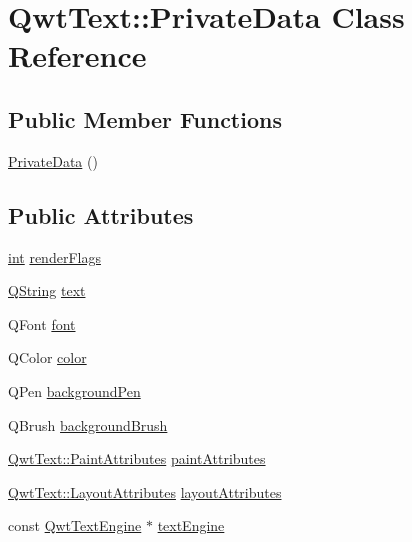\hypertarget{class_qwt_text_1_1_private_data}{\section{Qwt\-Text\-:\-:Private\-Data Class Reference}
\label{class_qwt_text_1_1_private_data}
}
\subsection*{Public Member Functions}
\begin{DoxyCompactItemize}
\item 
\hyperlink{class_qwt_text_1_1_private_data_a1ce7f844c2dda82aaa3c68c4bf7cf666}{Private\-Data} ()
\end{DoxyCompactItemize}
\subsection*{Public Attributes}
\begin{DoxyCompactItemize}
\item 
\hyperlink{ioapi_8h_a787fa3cf048117ba7123753c1e74fcd6}{int} \hyperlink{class_qwt_text_1_1_private_data_a85eca1b1929c48574ebfcbcfb20a5a26}{render\-Flags}
\item 
\hyperlink{group___u_a_v_objects_plugin_gab9d252f49c333c94a72f97ce3105a32d}{Q\-String} \hyperlink{class_qwt_text_1_1_private_data_a5d9f09e7ab55357d25c3361503b1ab5e}{text}
\item 
Q\-Font \hyperlink{class_qwt_text_1_1_private_data_a91298bf899633988604c34d0784d8cad}{font}
\item 
Q\-Color \hyperlink{class_qwt_text_1_1_private_data_a604e431cfccea5e98d6164e8e17ad37e}{color}
\item 
Q\-Pen \hyperlink{class_qwt_text_1_1_private_data_a31b82bbc33bc5e138c08929dd2f2c7a9}{background\-Pen}
\item 
Q\-Brush \hyperlink{class_qwt_text_1_1_private_data_a125d888e22552d71b480b1bdfd04d243}{background\-Brush}
\item 
\hyperlink{class_qwt_text_a0d239ca5c8e0cd3c748325ad453bb13f}{Qwt\-Text\-::\-Paint\-Attributes} \hyperlink{class_qwt_text_1_1_private_data_a7c4cea044e466e12174294f85a74092b}{paint\-Attributes}
\item 
\hyperlink{class_qwt_text_aadd451b81d506c5bbefdddb8a100b9a3}{Qwt\-Text\-::\-Layout\-Attributes} \hyperlink{class_qwt_text_1_1_private_data_a57e9e8baa197adaf87f8ec04fc72d6b3}{layout\-Attributes}
\item 
const \hyperlink{class_qwt_text_engine}{Qwt\-Text\-Engine} $\ast$ \hyperlink{class_qwt_text_1_1_private_data_a035f422e182dfab31278b23b019fe11f}{text\-Engine}
\end{DoxyCompactItemize}


